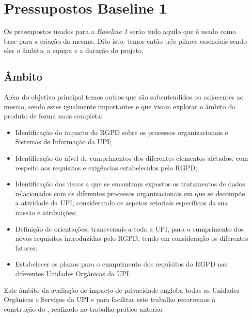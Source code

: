 \section{Pressupostos Baseline 1}

Os pressupostos usados para a \emph{Baseline 1} serão tudo aquilo que é usado como base para a criação da mesma. Dito isto, temos então três pilares essenciais sendo eles o âmbito, a equipa e a duração do projeto.

\subsection{Âmbito}
Além do objetivo principal temos outros que são subentendidos ou adjacentes ao mesmo, sendo estes igualmente importantes e que visam explorar o âmbito do produto de forma mais completa: 

\begin{itemize}
    \item Identificação do impacto do RGPD sobre os processos organizacionais e Sistemas de Informação da UPI;
    \item Identificação do nível de cumprimentos dos diferentes elementos afetados, com respeito aos requisitos e exigências estabelecidos pelo RGPD;
    \item Identificação dos riscos a que se encontram expostos os tratamentos de dados relacionados com os diferentes processos organizacionais em que se decompõe a atividade da UPI, considerando os aspetos setoriais específicos da sua missão e atribuições;
    \item Definição de orientações, transversais a toda a UPI, para o cumprimento dos novos requisitos introduzidas pelo RGPD, tendo em consideração os diferentes fatores;
    \item Estabelecer os planos para o cumprimento dos requisitos do RGPD nas diferentes Unidades Orgânicas da UPI.
\end{itemize}
  

Este âmbito da avaliação de impacto de privacidade engloba todas as Unidades Orgânicas e Serviços da UPI e para facilitar este trabalho recorremos à construção do , realizado no trabalho prático anterior 





